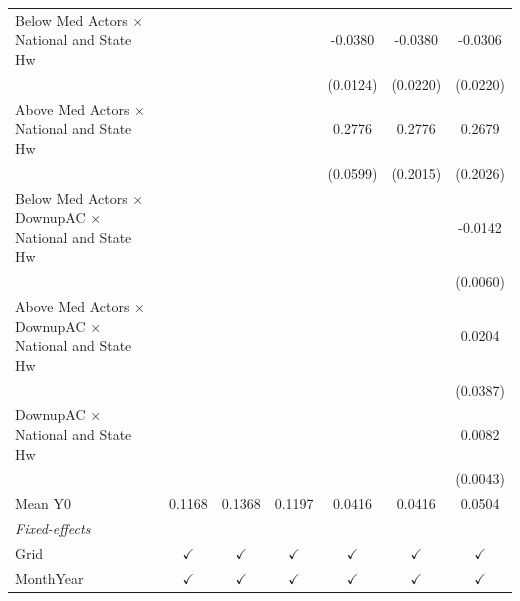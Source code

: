 \begin{table}[htbp]
\begin{tabular}{lcccccc}
      Below Med Actors $\times$ National and State Hw                     &               &               &               & -0.0380       & -0.0380       & -0.0306\\   
                                                                          &               &               &               & (0.0124)      & (0.0220)      & (0.0220)\\   
      Above Med Actors $\times$ National and State Hw                     &               &               &               & 0.2776        & 0.2776        & 0.2679\\   
                                                                          &               &               &               & (0.0599)      & (0.2015)      & (0.2026)\\   
      Below Med Actors $\times$ DownupAC $\times$ National and State Hw   &               &               &               &               &               & -0.0142\\   
                                                                          &               &               &               &               &               & (0.0060)\\   
      Above Med Actors $\times$ DownupAC $\times$ National and State Hw   &               &               &               &               &               & 0.0204\\   
                                                                          &               &               &               &               &               & (0.0387)\\   
      DownupAC $\times$ National and State Hw                             &               &               &               &               &               & 0.0082\\   
                                                                          &               &               &               &               &               & (0.0043)\\   
      \hline Mean Y0                                                      & 0.1168        & 0.1368        & 0.1197        & 0.0416        & 0.0416        & 0.0504\\  
      \midrule
      \emph{Fixed-effects}\\
      Grid                                                                & $\checkmark$  & $\checkmark$  & $\checkmark$  & $\checkmark$  & $\checkmark$  & $\checkmark$\\   
      MonthYear                                                           & $\checkmark$  & $\checkmark$  & $\checkmark$  & $\checkmark$  & $\checkmark$  & $\checkmark$\\   

\end{tabular}
\end{table}
